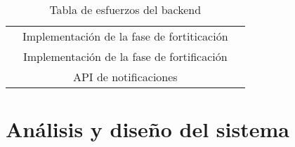 \documentclass[11pt, a4paper, titlepage]{article}
\begin{document}
\begin{landscape}
\begin{table}[hbt!]
\begin{tabular}{c|cc|c|}
\multicolumn{1}{|c|}{}                             & \multicolumn{2}{c|}{Implementación de la fase de fortiticación}                                                                                                                                                                                                                                                                   &                                     \\ \cline{2-3}
\multicolumn{1}{|c|}{}                             & \multicolumn{2}{c|}{Implementación de la fase de fortificación}                                                                                                                                                                                                                                                                   &                                     \\ \cline{2-3}
\multicolumn{1}{|c|}{}                             & \multicolumn{2}{c|}{API de notificaciones}                                                                                                                                                                                                                                                                                        &                                     \\ \hline
\end{tabular}
\caption{Tabla de esfuerzos del backend}
\label{table:backend}
\end{table}
\end{landscape}
\FloatBarrier
 
\section{Análisis y diseño del sistema}
\end{document}
